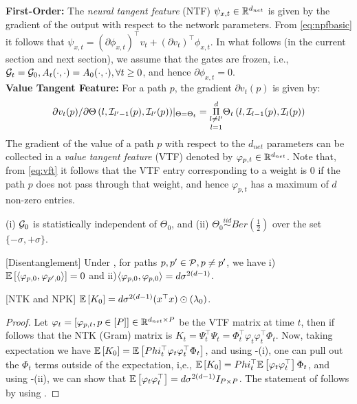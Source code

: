 \textbf{First-Order:} The \emph{neural tangent feature} (NTF) $\psi_{x,t}\in \R^{d_{net}}$ is given by the gradient of the output with respect to the network parameters. From \eqref{eq:npfbasic} it follows that $\psi_{x,t}=(\partial \phi_{x,t})^\top v_t +(\partial v_t)^\top\phi_{x,t}$. In what follows (in the current section and next section), we assume that the gates are frozen, i.e., $\G_t=\G_0, A_t(\cdot,\cdot)=A_0(\cdot,\cdot),\forall t\geq 0$, and hence $\partial \phi_{x,t}=0$.\hfill\\
\textbf{Value Tangent Feature:} For a path $p$, the gradient  $\partial v_t(p)$ is given by: \begin{align}\label{eq:vft}{\partial v_t(p)}/{\partial \Theta\left(l,\I_{l'-1}(p),\I_{l'}(p)\right)}|_{\Theta=\Theta_t}= \underset{l=1}{\underset{l\neq l'}{\overset{d}{\Pi}}} \Theta_t\left(l,\I_{l-1}(p),\I_{l}(p)\right)\end{align} The gradient of the value of a path $p$ with respect to the $d_{net}$ parameters can be collected in a \emph{value tangent feature} (VTF) denoted by $\varphi_{p,t}\in \R^{d_{net}}$. Note that, from \eqref{eq:vft} it follows that the VTF entry corresponding to a weight is $0$ if the path $p$ does not pass through that weight, and hence $\varphi_{p,t}$ has a maximum of $d$ non-zero entries.\hfill\\

\begin{assumption}\label{assmp:main}
(i) $\G_0$ is statistically independent of $\Theta_0$, and (ii) $\Theta_0\stackrel{iid}\sim Ber\left(\frac{1}{2}\right)$ over the set $\{-\sigma,+\sigma\}$. 
\end{assumption}
\begin{lemma}\label{lm:disentangle}[Disentanglement]
Under , for paths $p,p'\in \P, p\neq p'$, we have  i) $\E{\ip{\varphi_{p,0}, \varphi_{p',0}}}= 0$ and ii)${\ip{\varphi_{p,0}, \varphi_{p,0}}}= d\sigma^{2(d-1)}$.
\end{lemma}
\begin{theorem}\label{th:exp}[NTK and NPK]
$\E{K_0}=d\sigma^{2(d-1)}(x^\top x) \odot (\lambda_0)$.
\end{theorem}
\begin{proof} Let $\varphi_t=\left[\varphi_{p,t},p\in[P]\right]\in\R^{d_{net}\times P}$ be the VTF matrix at time $t$, then if follows that the NTK (Gram) matrix is  $K_t=\Psi^\top_t\Psi_t=\Phi^\top_t\varphi_t\varphi^\top_t\Phi_t$. Now, taking expectation we have $\E{K_0}=\E{Phi^\top_t\varphi_t\varphi^\top_t\Phi_t}$, and using -(i), one can pull out the $\Phi_t$ terms outside of the expectation, i,e., $\E{K_0}=Phi^\top_t\E{\varphi_t\varphi^\top_t}\Phi_t$, and using -(ii), we can show that $\E{\varphi_t\varphi^\top_t}=d\sigma^{2(d-1)}I_{P\times P}$. The statement of  follows by using .
\end{proof}
